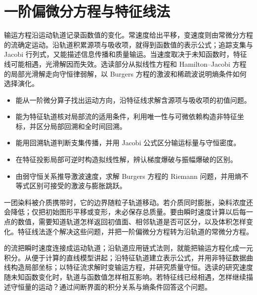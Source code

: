 \chapter{一阶偏微分方程与特征线法}
\label{b2:ch:07}
\begin{chapterabstract}
输运方程沿运动轨道记录函数值的变化。常速度给出平移，变速度则由常微分方程的流确定运动。沿轨道积累源项与吸收项，就得到函数值的表示公式；追踪支集与 Jacobi 行列式，又能描述信息传播和质量输运。当速度取决于未知函数时，特征线可能相遇，光滑解因而失效。选读部分从拟线性方程和 Hamilton--Jacobi 方程的局部光滑解走向守恒律弱解，以 Burgers 方程的激波和稀疏波说明熵条件如何选择演化。
\end{chapterabstract}

\begin{learninggoals}
\begin{itemize}
\item\label{b2:item:07-goal-lines}能从一阶微分算子找出运动方向，沿特征线求解含源项与吸收项的初值问题。
\item\label{b2:item:07-goal-flow}能为特征轨道核对局部流的适用条件，利用唯一性与可微依赖构造非特征坐标，并区分局部回溯和全时间回溯。
\item\label{b2:item:07-goal-density}能用回溯轨道判断支集传播，并用 Jacobi 公式区分输运标量与守恒密度。
\item\label{b2:item:07-goal-nonlinear}在特征投影局部可逆时构造拟线性解，辨认梯度爆破与振幅爆破的区别。
\item\label{b2:item:07-goal-entropy}由弱守恒关系推导激波速度，求解 Burgers 方程的 Riemann 问题，并用熵不等式区别可接受的激波与膨胀跳跃。
\end{itemize}
\end{learninggoals}

一团染料被介质携带时，它的边界随粒子轨道移动。若介质同时膨胀，染料浓度还会降低；仅把初始图形平移或变形，未必保存总质量。要由瞬时速度计算以后每一点的数值，需要知道轨道怎样返回初值面、相邻轨道是否可区分，以及体积怎样变化。特征线法逐个解决这些问题，并把一阶偏微分方程转为沿轨道的常微分方程。

\ProseParagraphBreak

的流把瞬时速度连接成运动轨道；沿轨道应用链式法则，就能把输运方程化成一元积分。从便于计算的直线模型讲起；沿特征轨道建立表示公式，并用非特征数据曲线构造局部坐标；以特征流求解时变输运方程，并研究质量守恒。选读的研究速度随未知函数变化时，轨道与函数值怎样相互影响。若特征线已经相遇，怎样继续描述守恒量的运动？通过间断界面的积分关系与熵条件回答这个问题。

